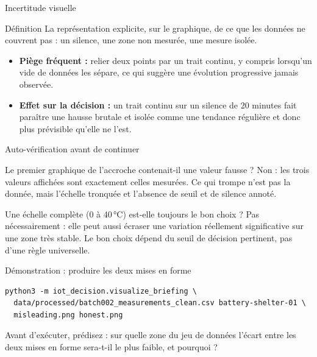 \documentclass[aspectratio=169]{beamer}
\begin{document}
\begin{frame}{Incertitude visuelle}
  \begin{block}{Définition}
    La représentation explicite, sur le graphique, de ce que les données ne couvrent pas : un silence, une zone non mesurée, une mesure isolée.
  \end{block}
  \begin{itemize}
    \item \textbf{Piège fréquent :} relier deux points par un trait continu, y compris lorsqu'un vide de données les sépare, ce qui suggère une évolution progressive jamais observée.
    \item \textbf{Effet sur la décision :} un trait continu sur un silence de 20 minutes fait paraître une hausse brutale et isolée comme une tendance régulière et donc plus prévisible qu'elle ne l'est.
  \end{itemize}
\end{frame}

\begin{frame}{Auto-vérification avant de continuer}
  \small
  \begin{block}{Le premier graphique de l'accroche contenait-il une valeur fausse ?}
    Non : les trois valeurs affichées sont exactement celles mesurées. Ce qui trompe n'est pas la donnée, mais l'échelle tronquée et l'absence de seuil et de silence annoté.
  \end{block}
  \begin{block}{Une échelle complète (0 à 40\,°C) est-elle toujours le bon choix ?}
    Pas nécessairement : elle peut aussi écraser une variation réellement significative sur une zone très stable. Le bon choix dépend du seuil de décision pertinent, pas d'une règle universelle.
  \end{block}
\end{frame}

\begin{frame}[fragile]{Démonstration : produire les deux mises en forme}
  \scriptsize
  \begin{verbatim}
python3 -m iot_decision.visualize_briefing \
  data/processed/batch002_measurements_clean.csv battery-shelter-01 \
  misleading.png honest.png
  \end{verbatim}
  \normalsize
  Avant d'exécuter, prédisez : sur quelle zone du jeu de données l'écart entre les deux mises en forme sera-t-il le plus faible, et pourquoi ?
\end{frame}
\end{document}
